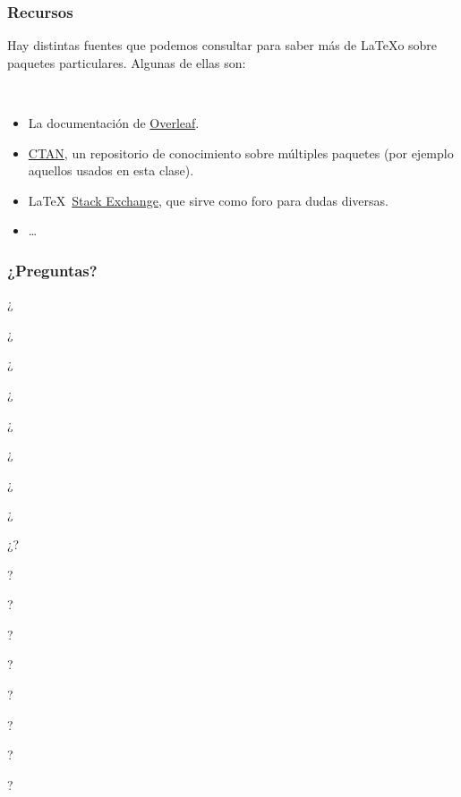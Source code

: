 
\begin{frame}
\frametitle{Recursos}

Hay distintas fuentes que podemos consultar para saber más de \LaTeX o sobre paquetes particulares.
Algunas de ellas son:

\

\begin{itemize}
\item La documentación de \href{https://www.overleaf.com/learn}{Overleaf}.
\item \href{https://ctan.org/}{CTAN}, un repositorio de conocimiento sobre múltiples paquetes (por ejemplo aquellos usados en esta clase).
\item \LaTeX\ \href{https://tex.stackexchange.com/}{Stack  Exchange}, que sirve como foro para dudas diversas.
\item \ldots
\end{itemize}

\end{frame}


\begin{frame}
\frametitle{¿Preguntas?}

\begin{center}
\begin{tiny}¿\end{tiny}
\begin{scriptsize}¿\end{scriptsize}
\begin{footnotesize}¿\end{footnotesize}
\begin{small}¿\end{small}
¿
\begin{large}¿\end{large}
\begin{Large}¿\end{Large}
\begin{huge}¿\end{huge}
\begin{Huge}¿?\end{Huge}
\begin{huge}?\end{huge}
\begin{Large}?\end{Large}
\begin{large}?\end{large}
?
\begin{small}?\end{small}
\begin{footnotesize}?\end{footnotesize}
\begin{scriptsize}?\end{scriptsize}
\begin{tiny}?\end{tiny}
\end{center}

\end{frame}